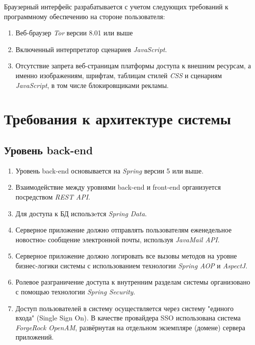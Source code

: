 \documentclass[12pt, a4paper]{article}
\begin{document}
Браузерный интерфейс разрабатывается с учетом следующих требований к
программному обеспечению на стороне пользователя:

\begin{enumerate}
\item Веб-браузер \textit{Tor} версии 8.01 или выше
\item Включенный интерпретатор сценариев \textit{JavaScript}.
\item Отсутствие запрета веб-страницам платформы доступа к внешним 
  ресурсам, а именно изображениям, шрифтам, таблицам стилей
  \textit{CSS} и сценариям \textit{JavaScript}, в том числе
  блокировщиками рекламы.
\end{enumerate}

\section{Требования к архитектуре системы}

\subsection{Уровень back-end}

\begin{enumerate}
\item Уровень back-end основывается на \textit{Spring} версии 5
  или выше.
\item Взаимодействие между уровнями back-end и front-end организуется
  посредством \textit{REST API}.
\item Для доступа к БД использeтся \textit{Spring Data}.
\item Серверное приложение должно отправлять пользователям
  еженедельное новостноe сообщение электронной почты,
  используя \textit{JavaMail API}.
\item Серверное приложение должно логировать все вызовы методов 
  на уровне бизнес-логики системы с использованием технологии
  \textit{Spring AOP} и \textit{AspectJ}.
\item Ролевое разграничение доступа к внутренним разделам системы 
  организовано с помощью технологии \textit{Spring Security}.
\item Доступ пользователей в систему осуществляется через систему 
  "единого входа" (Single Sign On). В качестве провайдера SSO использована 
  система \textit{ForgeRock OpenAM}, развёрнутая на отдельном экземпляре 
  (домене) сервера приложений.
\end{enumerate}
\end{document}
